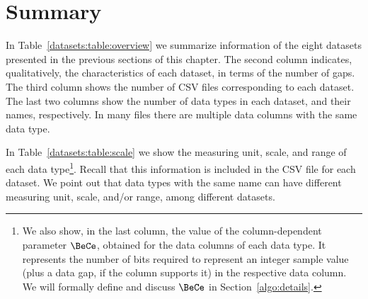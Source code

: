
\vspace{-15pt}
\section{Summary}
\label{datasets:summary}


\vspace{-5pt}
In Table~\ref{datasets:table:overview} we summarize information of the eight datasets presented in the previous sections of this chapter. The second column indicates, qualitatively, the characteristics of each dataset, in terms of the number of gaps. The third column shows the number of CSV files corresponding to each dataset. The last two columns show the number of data types in each dataset, and their names, respectively. In many files there are multiple data columns with the same data type.





\clearpage

\newcommand{\footNoteDataType}{\footnote{We also show, in the last column, the value of the column-dependent parameter $\BeCe$, obtained for the data columns of each data type. It represents the number of bits required to represent an integer sample value (plus a data gap, if the column supports it) in the respective data column. We will formally define and discuss $\BeCe$ in Section~\ref{algo:details}.}}

In Table~\ref{datasets:table:scale} we show the measuring unit, scale, and range of each data type\footNoteDataType. Recall that this information is included in the CSV file for each dataset.  We point out that data types with the same name can have different measuring unit, scale, and/or range, among different datasets. 

\vspace{+5pt}


